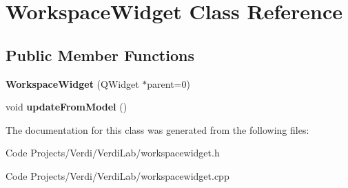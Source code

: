 \hypertarget{class_workspace_widget}{\section{\-Workspace\-Widget \-Class \-Reference}
\label{class_workspace_widget}
}
\subsection*{\-Public \-Member \-Functions}
\begin{DoxyCompactItemize}
\item 
\hypertarget{class_workspace_widget_ad79b858a67a019e9bc392a1791835cb7}{{\bfseries \-Workspace\-Widget} (\-Q\-Widget $\ast$parent=0)}\label{class_workspace_widget_ad79b858a67a019e9bc392a1791835cb7}

\item 
\hypertarget{class_workspace_widget_ad0e2677bd30d4459ea95350579c3c100}{void {\bfseries update\-From\-Model} ()}\label{class_workspace_widget_ad0e2677bd30d4459ea95350579c3c100}

\end{DoxyCompactItemize}


\-The documentation for this class was generated from the following files\-:\begin{DoxyCompactItemize}
\item 
\-Code Projects/\-Verdi/\-Verdi\-Lab/workspacewidget.\-h\item 
\-Code Projects/\-Verdi/\-Verdi\-Lab/workspacewidget.\-cpp\end{DoxyCompactItemize}
